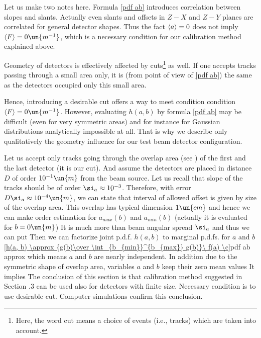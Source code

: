 Let us make two notes here. Formula \ref{pdf ab} introduces correlation between slopes and slants. Actually even slants and offsets in $Z-X$ and $Z-Y$ planes are correlated for general detector shapes. Thus the fact $\left\langle a\right\rangle = 0$ does not imply $\mean{F} = 0\un{m^{-1}}$, which is a necessary condition for our calibration method explained above.

Geometry of detectors is effectively affected by cuts\footnote{%
Here, the word cut means a choice of events (i.e., tracks) which are taken into account.}
as well. If one accepts tracks passing through a small area only, it is (from point of view of \equ{} \ref{pdf ab}) the same as the detectors occupied only this small area.

Hence, introducing a desirable cut offers a way to meet condition condition $\mean F = 0 \un{m^{-1}}$. However, evaluating $h(a,b)$ by formula \ref{pdf ab} may be difficult (even for very symmetric areas) and for instance for Gaussian distributions analytically impossible at all. That is why we describe only qualitatively the geometry influence for our test beam detector configuration.

Let us accept only tracks going through the overlap area (see \fg{} ) of the first and the last detector (it is our cut). And assume the detectors are placed in distance $D$ of order $10^{-1}\un{m}$ from the beam source. Let us recall that slope of the tracks should be of order $\si_a\approx 10^{-3}$. Therefore, with error $D\si_a\approx 10^{-4}\un{m}$, we can state that interval of allowed offset is given by size of the overlap area. This overlap has typical dimension $1\un{cm}$ and hence we can make order estimation for $a_{max}(b)$ and $a_{min}(b)$ (actually it is evaluated for $b = 0\un{m}$)
It is much more than beam angular spread $\si_a$ and thus we can put
Then we can factorize joint p.d.f. $h(a, b)$ to marginal p.d.fs. for $a$ and $b$
\eqref{h(a, b) \approx {g(b)\over \int_{b_{min}}^{b_{max}} g(b)}\  f(a) \c}{pdf ab approx}
which means $a$ and $b$ are nearly independent. In addition due to the symmetric shape of overlap area, variables
$a$ and $b$ keep their zero mean values
It implies
The conclusion of this section is that calibration method suggested in Section \the\nch.3 can be used also for detectors with finite size. Necessary condition is to use desirable cut. Computer simulations confirm this conclusion.





